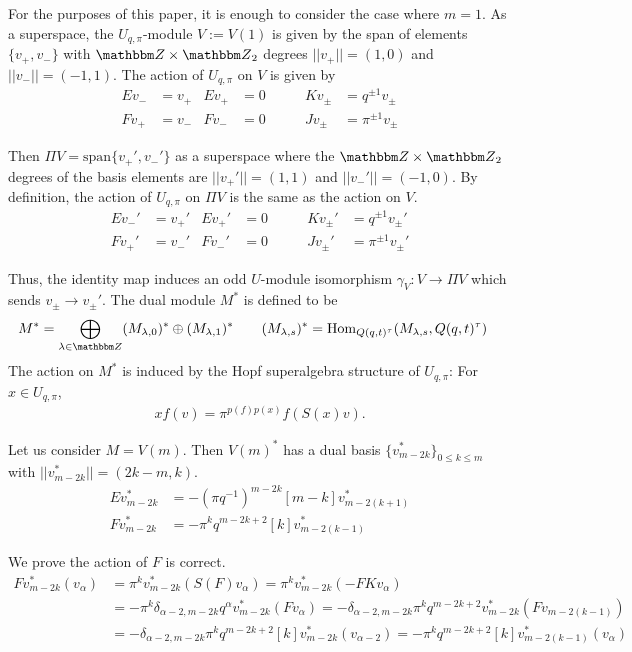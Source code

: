 \documentclass{amsart}
\theoremstyle{plain}
\theoremstyle{definition}
\theoremstyle{definition}
\numberwithin{equation}{section}
\numberwithin{theorem}{section}
\newcommand{\Hom}{{\rm Hom}}
\renewcommand{\to}{\rightarrow}
\numberwithin{equation}{section}
\def\Z{{\mathbbm Z}}
\begin{document}
For the purposes of this paper, it is enough to consider the case where $m=1$.
As a superspace, the $U_{q,\pi}$-module $V:=V(1)$ is given by the span of elements $\{v_+, v_-\}$ with $\Z\times \Z_2$ degrees $||v_+||=(1,0)$ and $||v_-||=(-1,1)$.
The action of $U_{q,\pi}$ on $V$ is given by
\begin{align*}
  Ev_{-}&=v_+  & Ev_+&=0 &\qquad Kv_{\pm}&=q^{\pm 1}v_{\pm}\\
  Fv_{+}&=v_{-} & Fv_-&=0 & \qquad Jv_{\pm}&=\pi^{\pm 1}v_{\pm}
\end{align*}

Then $\Pi V=\text{span} \{v_+', v_-'\}$ as a superspace where the $\Z\times \Z_2$ degrees of the basis elements are $||v_+'||=(1,1)$ and $||v_-'||=(-1,0)$.
By definition, the action of $U_{q,\pi}$ on $\Pi V$ is the same as the action on $V$.
\begin{align*}
  Ev_{-}'&=v_+'  & Ev_+'&=0 &\qquad Kv_{\pm}'&=q^{\pm 1}v_{\pm}'\\
  Fv_{+}'&=v_{-}' & Fv_-'&=0 & \qquad Jv_{\pm}'&=\pi^{\pm 1}v_{\pm}'
\end{align*}

Thus, the identity map induces an odd $U$-module isomorphism $\gamma_V: V \to \Pi V$ which sends $v_\pm \to v_\pm'$.
The dual module $M^*$ is defined to be
\begin{align*}
  M^*=\bigoplus_{\lambda \in \Z} (M_{\lambda,0})^*\oplus (M_{\lambda,1})^* &\qquad (M_{\lambda,s})^*=\Hom_{Q(q,t)^\tau}(M_{\lambda,s},Q(q,t)^\tau)
\end{align*}
The action on $M^*$ is induced by the Hopf superalgebra structure of $U_{q,\pi}$: For $x\in U_{q,\pi}$,
\begin{align*}
  xf(v)=\pi^{p(f)p(x)}f(S(x)v).
\end{align*}

Let us consider $M=V(m)$.
Then $V(m)^*$ has a dual basis $\{v_{m-2k}^*\}_{0 \leq k\leq m}$ with $||v_{m-2k}^*||=(2k-m,k)$.
\begin{align*}
  Ev_{m-2k}^* &= -(\pi q^{-1})^{m-2k}[m-k]v_{m-2(k+1)}^* \\
  Fv_{m-2k}^* &= -\pi^k q^{m-2k+2}[k]v_{m-2(k-1)}^*
\end{align*}

We prove the action of $F$ is correct.
\begin{align*}
  F v_{m-2k}^*(v_\alpha) &= \pi^k v_{m-2k}^*(S(F)v_{\alpha}) = \pi^k v_{m-2k}^*(-FKv_{\alpha}) \\
  &=-\pi^k\delta_{\alpha-2, m-2k}q^\alpha v_{m-2k}^*(Fv_{\alpha})= -\delta_{\alpha-2, m-2k} \pi^k q^{m-2k+2} v_{m-2k}^*(Fv_{m-2(k-1)}) \\
  &=-\delta_{\alpha-2, m-2k} \pi^k q^{m-2k+2} [k]v_{m-2k}^*(v_{\alpha-2})=-\pi^kq^{m-2k+2}[k] v_{m-2(k-1)}^*(v_\alpha)
\end{align*}
\end{document}
